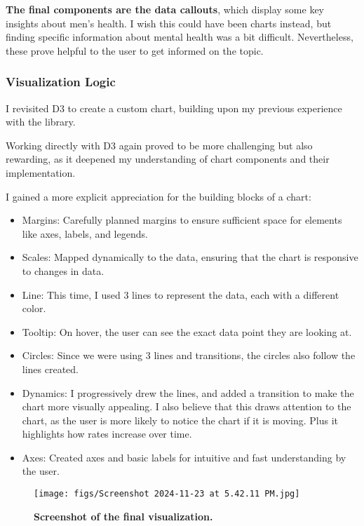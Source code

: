 \documentclass{article}
\begin{document}
\textbf{The final components are the data callouts}, which display some key insights
about men's health. I wish this could have been charts instead,
but finding specific information about mental health was a bit difficult.
Nevertheless, these prove helpful to the user to get informed on the topic.

\subsubsection{Visualization Logic}
\label{subsubsec:Visualization Logic}

I revisited D3 to create a custom chart, building upon my previous 
experience with the library. 

Working directly with D3 again proved to be more challenging 
but also rewarding, as it deepened my understanding of chart components 
and their implementation.

I gained a more explicit appreciation for the building blocks of a chart:

\begin{itemize}
  \item Margins: Carefully planned margins to ensure sufficient space for elements like axes, labels, and legends.
  \item Scales: Mapped dynamically to the data, ensuring that the chart is responsive to changes in data.
  \item Line: This time, I used 3 lines to represent the data, each with a different color.
  \item Tooltip: On hover, the user can see the exact data point they are looking at.
  \item Circles: Since we were using 3 lines and transitions, the circles also follow the lines created.
  \item Dynamics: I progressively drew the lines, and added a transition to make the chart more visually appealing. 
  I also believe that this draws attention to the chart, as the user is more likely to notice the chart if it is moving.
  Plus it highlights how rates increase over time.
  \item Axes: Created axes and basic labels for intuitive and fast understanding by the user.
\end{itemize}

\begin{figure}[ht] 
  \centering
  \texttt{[image: figs/Screenshot 2024-11-23 at 5.42.11 PM.jpg]}
  \caption{
    \textbf{Screenshot of the final visualization.}
  }
  \label{fig:fig1}
\end{figure}
\end{document}
